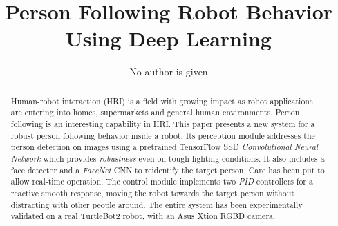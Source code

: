\documentclass{svproc}
\begin{document}
\mainmatter              %
%
\title{Person Following Robot Behavior Using Deep Learning}
%
%
\author{No author is given}

\maketitle              %

\begin{abstract}
Human-robot interaction (HRI) is a field with growing impact as robot applications are entering into homes, supermarkets and general human environments. Person following is an interesting capability in HRI. This paper presents a new system for a robust person following behavior inside a robot. Its perception module addresses the person detection on images using a pretrained TensorFlow SSD \emph{Convolutional Neural Network} which provides \emph{robustness} even on tough lighting conditions. It also includes a face detector and a \emph{FaceNet} CNN to reidentify the target person. Care has been put to allow real-time operation. 
The control module implements two \emph{PID} controllers for a reactive smooth response, moving the robot towards the target person without distracting with other people around. The entire system has been experimentally validated on a real TurtleBot2 robot, with an Asus Xtion RGBD camera.
\end{abstract}
%






\end{document}
